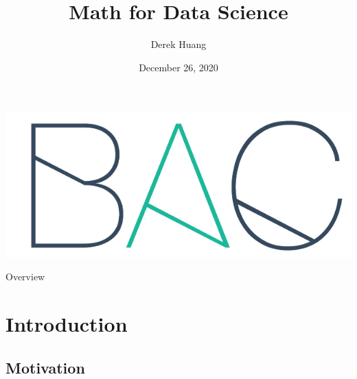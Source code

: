 \documentclass{beamer}
\title[Math for Data Science]{Math for Data Science}
\author[Derek Huang (BAC Advanced Team)]{Derek Huang}
\institute[BAC Advanced Team]{BAC Advanced Team}
\date[December 26, 2020]{December 26, 2020}
\numberwithin{equation}{section}
\begin{document}
\begin{frame}
    \titlepage
    \centering
    \includegraphics[scale = 0.1]{../bac_logo1.png}
\end{frame}

\begin{frame}{Overview}
	\tableofcontents
\end{frame}

\section{Introduction}

\subsection{Motivation}
\end{document}
